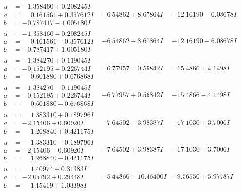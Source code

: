 \documentclass[1p]{elsarticle_modified}
\theoremstyle{definition}
\begin{document}
$$\begin{array}{c|c|c}
\begin{aligned}
u &= -1.358460 + 0.208245 I \\
a &= \phantom{-}0.161561 + 0.357612 I \\
b &= -0.787417 - 1.005180 I\end{aligned}
 & -6.54862 + 8.67864 I & -12.16190 - 6.08678 I \\ \hline\begin{aligned}
u &= -1.358460 - 0.208245 I \\
a &= \phantom{-}0.161561 - 0.357612 I \\
b &= -0.787417 + 1.005180 I\end{aligned}
 & -6.54862 - 8.67864 I & -12.16190 + 6.08678 I \\ \hline\begin{aligned}
u &= -1.384270 + 0.119045 I \\
a &= -0.152195 - 0.226744 I \\
b &= \phantom{-}0.601880 + 0.676868 I\end{aligned}
 & -6.77957 - 0.56842 I & -15.4866 + 4.1498 I \\ \hline\begin{aligned}
u &= -1.384270 - 0.119045 I \\
a &= -0.152195 + 0.226744 I \\
b &= \phantom{-}0.601880 - 0.676868 I\end{aligned}
 & -6.77957 + 0.56842 I & -15.4866 - 4.1498 I \\ \hline\begin{aligned}
u &= \phantom{-}1.383310 + 0.189796 I \\
a &= -2.15406 + 0.60920 I \\
b &= \phantom{-}1.268840 + 0.421175 I\end{aligned}
 & -7.64502 - 3.98387 I & -17.1030 + 3.7006 I \\ \hline\begin{aligned}
u &= \phantom{-}1.383310 - 0.189796 I \\
a &= -2.15406 - 0.60920 I \\
b &= \phantom{-}1.268840 - 0.421175 I\end{aligned}
 & -7.64502 + 3.98387 I & -17.1030 - 3.7006 I \\ \hline\begin{aligned}
u &= \phantom{-}1.40974 + 0.31383 I \\
a &= -2.05792 + 0.29448 I \\
b &= \phantom{-}1.15419 + 1.03398 I\end{aligned}
 & -5.44866 - 10.46400 I & -9.56556 + 5.97787 I \\ \hline\begin{aligned}

\end{aligned}
\end{array}$$
\end{document}
